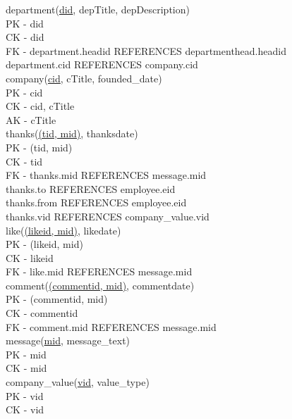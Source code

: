 \documentclass[11pt]{report}
\begin{document}
department(\underline{did}, depTitle, depDescription) \\
PK - did \\
CK - did \\
FK - department.headid REFERENCES departmenthead.headid \\
     department.cid REFERENCES company.cid \\

company(\underline{cid}, cTitle, founded\_date) \\
PK - cid \\
CK - cid, cTitle \\
AK - cTitle \\

thanks(\underline{(tid, mid)}, thanksdate) \\
PK - (tid, mid) \\
CK - tid \\
FK - thanks.mid REFERENCES message.mid \\
     thanks.to REFERENCES employee.eid \\
     thanks.from REFERENCES employee.eid \\
     thanks.vid REFERENCES company\_value.vid \\

like(\underline{(likeid, mid)}, likedate) \\
PK - (likeid, mid) \\
CK - likeid \\
FK - like.mid REFERENCES message.mid \\

comment(\underline{(commentid, mid)}, commentdate) \\
PK - (commentid, mid) \\
CK - commentid \\
FK - comment.mid REFERENCES message.mid \\

message(\underline{mid}, message\_text) \\
PK - mid \\
CK - mid \\

company\_value(\underline{vid}, value\_type) \\
PK - vid \\
CK - vid \\
\clearpage
\end{document}
